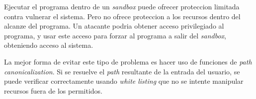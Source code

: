 Ejecutar el programa dentro de un \textit{sandbox} puede ofrecer proteccion limitada contra vulnerar el sistema.
Pero no ofrece proteccion a los recursos dentro del alcanze del programa.
Un atacante podria obtener acceso privilegiado al programa, y usar este acceso para forzar al programa a salir del \textit{sandbox}, obteniendo acceso al sistema.

La mejor forma de evitar este tipo de problema es hacer uso de funciones de \textit{path canonicalization}.
Si se resuelve el \textit{path} resultante de la entrada del usuario, se puede verificar correctamente usando \textit{white listing} que no se intente manipular recursos fuera de los permitidos.


